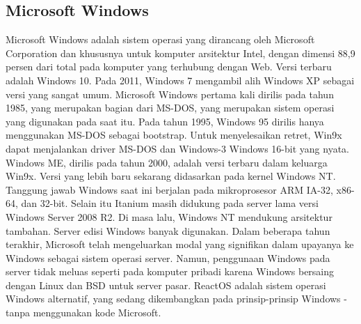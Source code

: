 \subsection{Microsoft Windows}
	\begin{enumerate}
		Microsoft Windows adalah sistem operasi yang dirancang oleh Microsoft Corporation dan khususnya untuk komputer arsitektur Intel, dengan dimensi 88,9 persen dari total pada komputer yang terhubung dengan Web. Versi terbaru adalah Windows 10.
		Pada 2011, Windows 7 mengambil alih Windows XP sebagai versi yang sangat umum. Microsoft Windows pertama kali dirilis pada tahun 1985, yang merupakan bagian dari MS-DOS, yang merupakan sistem operasi yang digunakan pada saat itu. Pada tahun 1995, Windows 95 dirilis hanya menggunakan MS-DOS sebagai bootstrap. Untuk menyelesaikan retret, Win9x dapat menjalankan driver MS-DOS dan Windows-3 Windows 16-bit yang nyata. Windows ME, dirilis pada tahun 2000, adalah versi terbaru dalam keluarga Win9x. Versi yang lebih baru sekarang didasarkan pada kernel Windows NT. Tanggung jawab Windows saat ini berjalan pada mikroprosesor ARM IA-32, x86-64, dan 32-bit. Selain itu Itanium masih didukung pada server lama versi Windows Server 2008 R2. Di masa lalu, Windows NT mendukung arsitektur tambahan. Server edisi Windows banyak digunakan. Dalam beberapa tahun terakhir, Microsoft telah mengeluarkan modal yang signifikan dalam upayanya ke Windows sebagai sistem operasi server. Namun, penggunaan Windows pada server tidak meluas seperti pada komputer pribadi karena Windows bersaing dengan Linux dan BSD untuk server pasar. ReactOS adalah sistem operasi Windows alternatif, yang sedang dikembangkan pada prinsip-prinsip Windows - tanpa menggunakan kode Microsoft.
	\end{enumerate}
	
	
\cite{silberschatz2014operating}
\cite{hoare1974monitors}
\cite{bach1986design}
\cite{love2005linux}
\cite{kukreja2006rui}
\cite{mckeown2009software}
\cite{russinovich2005microsoft}
\cite{van1994treecon}
\cite{mckusick1985performance}
\cite{higgins1988clustal}
